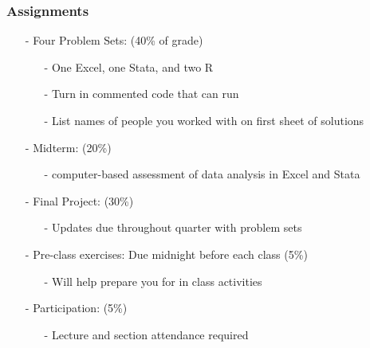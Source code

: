 \documentclass[11pt]{beamer}
\begin{document}
\begin{frame}
\frametitle{Assignments}

\begin{itemize}
\item[-] \alert{Four Problem Sets}: (40\% of grade)
\begin{itemize}
\item[-] One Excel, one Stata, and two R
\item[-] Turn in commented code that can run 
\item[-] List names of people you worked with on first sheet of solutions \pause
\end{itemize}
\item[-] \alert{Midterm}: (20\%) 
\begin{itemize}
	\item[-] computer-based assessment of data analysis in Excel and Stata \pause
\end{itemize}
\item[-] \alert{Final Project}: (30\%) 
\begin{itemize}
\item[-] Updates due throughout quarter with problem sets \pause
\end{itemize}
\item[-] \alert{Pre-class exercises}: Due midnight before each class (5\%) 
\begin{itemize}
\item[-] Will help prepare you for in class activities \pause
\end{itemize}
\item[-] \alert{Participation}: (5\%)
\begin{itemize}
\item[-] Lecture and section \alert{attendance required}
\end{itemize}
\end{itemize}
\end{frame}
\end{document}
